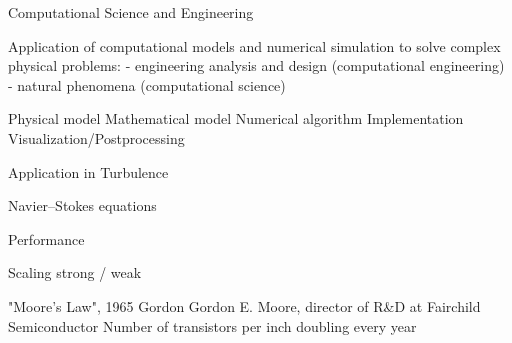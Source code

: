 

Computational Science and Engineering

Application of computational models and numerical simulation to solve complex physical problems:
- engineering analysis and design (computational engineering) 
- natural phenomena (computational science)

Physical model
Mathematical model
Numerical algorithm
Implementation
Visualization/Postprocessing

Application in Turbulence

Navier--Stokes equations

Performance

Scaling strong / weak

"Moore's Law", 1965 Gordon  Gordon E. Moore, director of R&D at Fairchild Semiconductor 
Number of transistors per inch doubling every year





